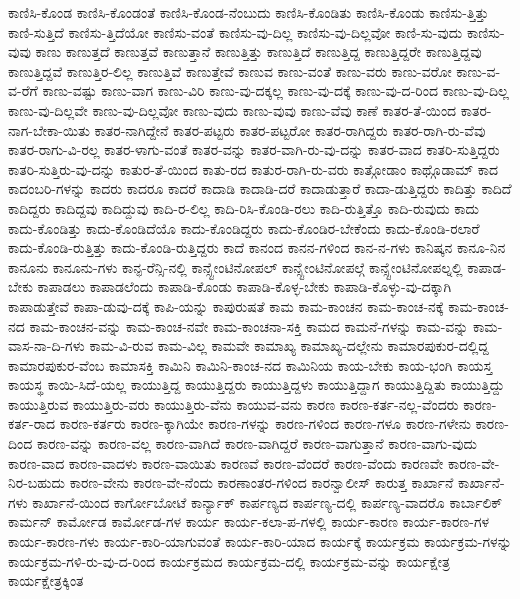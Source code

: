 {ಕಾಣಿಸಿ-ಕೊಂಡ
ಕಾಣಿಸಿ-ಕೊಂಡಂತೆ
ಕಾಣಿಸಿ-ಕೊಂಡ-ನೆಂಬುದು
ಕಾಣಿಸಿ-ಕೊಂಡಿತು
ಕಾಣಿಸಿ-ಕೊಂಡು
ಕಾಣಿಸು-ತ್ತಿತ್ತು
ಕಾಣಿ-ಸುತ್ತಿದೆ
ಕಾಣಿಸು-ತ್ತಿದೆಯೋ
ಕಾಣಿಸು-ವಂತೆ
ಕಾಣಿಸು-ವು-ದಿಲ್ಲ
ಕಾಣಿಸು-ವು-ದಿಲ್ಲವೋ
ಕಾಣಿ-ಸು-ವುದು
ಕಾಣಿಸು-ವುವು
ಕಾಣು
ಕಾಣುತ್ತದೆ
ಕಾಣುತ್ತವೆ
ಕಾಣುತ್ತಾನೆ
ಕಾಣುತ್ತಿತ್ತು
ಕಾಣುತ್ತಿದೆ
ಕಾಣುತ್ತಿದ್ದ
ಕಾಣುತ್ತಿದ್ದರೇ
ಕಾಣುತ್ತಿದ್ದವು
ಕಾಣುತ್ತಿದ್ದವೆ
ಕಾಣುತ್ತಿರ-ಲಿಲ್ಲ
ಕಾಣುತ್ತಿವೆ
ಕಾಣುತ್ತೇವೆ
ಕಾಣುವ
ಕಾಣು-ವಂತೆ
ಕಾಣು-ವರು
ಕಾಣು-ವರೋ
ಕಾಣು-ವ-ವ-ರೆಗೆ
ಕಾಣು-ವಷ್ಟು
ಕಾಣು-ವಾಗ
ಕಾಣು-ವಿರಿ
ಕಾಣು-ವು-ದಕ್ಕಲ್ಲ
ಕಾಣು-ವು-ದಕ್ಕೆ
ಕಾಣು-ವು-ದ-ರಿಂದ
ಕಾಣು-ವು-ದಿಲ್ಲ
ಕಾಣು-ವು-ದಿಲ್ಲವೇ
ಕಾಣು-ವು-ದಿಲ್ಲವೋ
ಕಾಣು-ವುದು
ಕಾಣು-ವುವು
ಕಾಣು-ವೆವು
ಕಾಣೆ
ಕಾತರ-ತೆ-ಯಿಂದ
ಕಾತರ-ನಾಗ-ಬೇಕಾ-ಯಿತು
ಕಾತರ-ನಾಗಿದ್ದೇನೆ
ಕಾತರ-ಪಟ್ಟರು
ಕಾತರ-ಪಟ್ಟರೋ
ಕಾತರ-ರಾಗಿದ್ದರು
ಕಾತರ-ರಾಗಿ-ರು-ವೆವು
ಕಾತರ-ರಾಗು-ವಿ-ರಲ್ಲ
ಕಾತರ-ಳಾಗು-ವಂತೆ
ಕಾತರ-ವನ್ನು
ಕಾತರ-ವಾಗಿ-ರು-ವು-ದನ್ನು
ಕಾತರ-ವಾದ
ಕಾತರಿ-ಸುತ್ತಿದ್ದರು
ಕಾತರಿ-ಸುತ್ತಿರು-ವು-ದನ್ನು
ಕಾತುರ-ತೆ-ಯಿಂದ
ಕಾತು-ರದ
ಕಾತುರ-ರಾಗಿ-ರು-ವರು
ಕಾತ್ಗೋಡಾಂ
ಕಾಥ್ಗೊಡಾಮ್
ಕಾದ
ಕಾದಂಬರಿ-ಗಳನ್ನು
ಕಾದರು
ಕಾದರೂ
ಕಾದರೆ
ಕಾದಾಡಿ
ಕಾದಾಡಿ-ದರೆ
ಕಾದಾಡುತ್ತಾರೆ
ಕಾದಾ-ಡುತ್ತಿದ್ದರು
ಕಾದಿತ್ತು
ಕಾದಿದೆ
ಕಾದಿದ್ದರು
ಕಾದಿದ್ದವು
ಕಾದಿದ್ದುವು
ಕಾದಿ-ರ-ಲಿಲ್ಲ
ಕಾದಿ-ರಿಸಿ-ಕೊಂಡಿ-ರಲು
ಕಾದಿ-ರುತ್ತಿತ್ತೊ
ಕಾದಿ-ರುವುದು
ಕಾದು
ಕಾದು-ಕೊಂಡಿತ್ತು
ಕಾದು-ಕೊಂಡಿದೆಯೊ
ಕಾದು-ಕೊಂಡಿದ್ದರು
ಕಾದು-ಕೊಂಡಿರ-ಬೇಕೆಂದು
ಕಾದು-ಕೊಂಡಿ-ರಲಾರೆ
ಕಾದು-ಕೊಂಡಿ-ರುತ್ತಿತ್ತು
ಕಾದು-ಕೊಂಡಿ-ರುತ್ತಿದ್ದರು
ಕಾದೆ
ಕಾನಂದ
ಕಾನನ-ಗಳಿಂದ
ಕಾನ-ನ-ಗಳು
ಕಾನಿಷ್ಕನ
ಕಾನೂ-ನಿನ
ಕಾನೂನು
ಕಾನೂನು-ಗಳು
ಕಾನ್ಫ-ರೆನ್ಸಿ-ನಲ್ಲಿ
ಕಾನ್ಸ್ಟೇಂಟಿನೋಪಲ್
ಕಾನ್ಸ್ಟೇಂಟಿನೋಪಲ್ಗೆ
ಕಾನ್ಸ್ಟೇಂಟಿನೋಪಲ್ನಲ್ಲಿ
ಕಾಪಾಡ-ಬೇಕು
ಕಾಪಾಡಲು
ಕಾಪಾಡಲೆಂದು
ಕಾಪಾಡಿ-ಕೊಂಡು
ಕಾಪಾಡಿ-ಕೊಳ್ಳ-ಬೇಕು
ಕಾಪಾಡಿ-ಕೊಳ್ಳು-ವು-ದಕ್ಕಾಗಿ
ಕಾಪಾಡುತ್ತೇವೆ
ಕಾಪಾ-ಡುವು-ದಕ್ಕೆ
ಕಾಪಿ-ಯನ್ನು
ಕಾಪುರುಷತೆ
ಕಾಮ
ಕಾಮ-ಕಾಂಚನ
ಕಾಮ-ಕಾಂಚ-ನಕ್ಕೆ
ಕಾಮ-ಕಾಂಚ-ನದ
ಕಾಮ-ಕಾಂಚನ-ವನ್ನು
ಕಾಮ-ಕಾಂಚ-ನವೇ
ಕಾಮ-ಕಾಂಚನಾ-ಸಕ್ತಿ
ಕಾಮದ
ಕಾಮನೆ-ಗಳನ್ನು
ಕಾಮ-ವನ್ನು
ಕಾಮ-ವಾಸ-ನಾ-ದಿ-ಗಳು
ಕಾಮ-ವಿ-ರುವ
ಕಾಮ-ವಿಲ್ಲ
ಕಾಮವೇ
ಕಾಮಾಖ್ಯ
ಕಾಮಾಖ್ಯ-ದಲ್ಲೇನು
ಕಾಮಾರಪುಕುರ-ದಲ್ಲಿದ್ದ
ಕಾಮಾರಪುಕುರ-ವೆಂಬ
ಕಾಮಾಸಕ್ತಿ
ಕಾಮಿನಿ
ಕಾಮಿನಿ-ಕಾಂಚ-ನದ
ಕಾಮಿನಿಯ
ಕಾಯ-ಬೇಕು
ಕಾಯ-ಭಂಗಿ
ಕಾಯಸ್ತ
ಕಾಯಸ್ಥ
ಕಾಯಿ-ಸಿದೆ-ಯಲ್ಲ
ಕಾಯುತ್ತಿದ್ದ
ಕಾಯುತ್ತಿದ್ದರು
ಕಾಯುತ್ತಿದ್ದಳು
ಕಾಯುತ್ತಿದ್ದಾಗ
ಕಾಯುತ್ತಿದ್ದಿತು
ಕಾಯುತ್ತಿದ್ದು
ಕಾಯುತ್ತಿರುವ
ಕಾಯುತ್ತಿರು-ವರು
ಕಾಯುತ್ತಿರು-ವೆನು
ಕಾಯುವ-ವನು
ಕಾರಣ
ಕಾರಣ-ಕರ್ತ-ನಲ್ಲ-ವೆಂದರು
ಕಾರಣ-ಕರ್ತ-ರಾದ
ಕಾರಣ-ಕರ್ತರು
ಕಾರಣ-ಕ್ಕಾಗಿಯೇ
ಕಾರಣ-ಗಳನ್ನು
ಕಾರಣ-ಗಳಿಂದ
ಕಾರಣ-ಗಳೂ
ಕಾರಣ-ಗಳೇನು
ಕಾರಣ-ದಿಂದ
ಕಾರಣ-ವನ್ನು
ಕಾರಣ-ವಲ್ಲ
ಕಾರಣ-ವಾಗಿದೆ
ಕಾರಣ-ವಾಗಿದ್ದರೆ
ಕಾರಣ-ವಾಗುತ್ತಾನೆ
ಕಾರಣ-ವಾಗು-ವುದು
ಕಾರಣ-ವಾದ
ಕಾರಣ-ವಾದಳು
ಕಾರಣ-ವಾಯಿತು
ಕಾರಣವೆ
ಕಾರಣ-ವೆಂದರೆ
ಕಾರಣ-ವೆಂದು
ಕಾರಣವೇ
ಕಾರಣ-ವೇ-ನಿರ-ಬಹುದು
ಕಾರಣ-ವೇನು
ಕಾರಣ-ವೇ-ನೆಂದು
ಕಾರಣಾಂತರ-ಗಳಿಂದ
ಕಾರನ್ವಾಲೀಸ್
ಕಾರುತ್ತ
ಕಾರ್ಖಾನೆ
ಕಾರ್ಖಾನೆ-ಗಳು
ಕಾರ್ಖಾನೆ-ಯಿಂದ
ಕಾರ್ಗೋಬೋಟೆ
ಕಾರ್ನ್ಯಾಕ್
ಕಾರ್ಪಣ್ಯದ
ಕಾರ್ಪಣ್ಯ-ದಲ್ಲಿ
ಕಾರ್ಪಣ್ಯ-ವಾದರೊ
ಕಾರ್ಬಾಲಿಕ್
ಕಾರ್ಮನ್
ಕಾರ್ಮೋಡ
ಕಾರ್ಮೋಡ-ಗಳ
ಕಾರ್ಯ
ಕಾರ್ಯ-ಕಲಾ-ಪ-ಗಳಲ್ಲಿ
ಕಾರ್ಯ-ಕಾರಣ
ಕಾರ್ಯ-ಕಾರಣ-ಗಳ
ಕಾರ್ಯ-ಕಾರಣ-ಗಳು
ಕಾರ್ಯ-ಕಾರಿ-ಯಾಗುವಂತೆ
ಕಾರ್ಯ-ಕಾರಿ-ಯಾದ
ಕಾರ್ಯಕ್ಕೆ
ಕಾರ್ಯಕ್ರಮ
ಕಾರ್ಯಕ್ರಮ-ಗಳನ್ನು
ಕಾರ್ಯಕ್ರಮ-ಗಳಿ-ರು-ವು-ದ-ರಿಂದ
ಕಾರ್ಯಕ್ರಮದ
ಕಾರ್ಯಕ್ರಮ-ದಲ್ಲಿ
ಕಾರ್ಯಕ್ರಮ-ವನ್ನು
ಕಾರ್ಯಕ್ಷೇತ್ರ
ಕಾರ್ಯಕ್ಷೇತ್ರಕ್ಕಿಂತ
}

